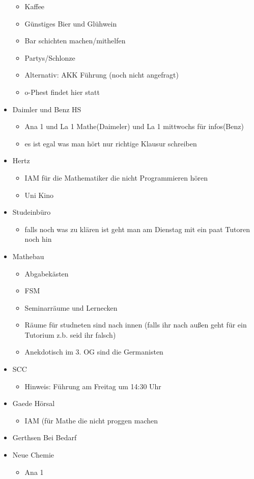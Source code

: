 \documentclass[10pt,twocolumn,ngerman]{scrartcl}
\begin{document}
\begin{itemize}
\begin{itemize}
            \item Kaffee
            \item Günstiges Bier und Glühwein
            \item Bar schichten machen/mithelfen
            \item Partys/Schlonze
            \item Alternativ: AKK Führung (noch nicht angefragt)
            \item o-Phest findet hier statt
        \end{itemize}
    \item Daimler und Benz HS
        \begin{itemize}
            \item Ana 1 und La 1 Mathe(Daimeler) und La 1 mittwochs für infos(Benz)
            \item es ist egal was man hört nur richtige Klausur schreiben
        \end{itemize}
    \item Hertz
        \begin{itemize}
            \item IAM für die Mathematiker die nicht Programmieren hören
            \item Uni Kino
        \end{itemize}
    \item Studeinbüro
        \begin{itemize}
            \item falls noch was zu klären ist geht man am Dienstag mit ein paat Tutoren
                noch hin
        \end{itemize}
    \item Mathebau
        \begin{itemize}
            \item Abgabekästen
            \item FSM
            \item Seminarräume und Lernecken
            \item Räume für studneten sind nach innen (falls ihr nach außen geht für
                ein Tutorium z.b. seid ihr falsch)
            \item Anekdotisch im 3. OG sind die Germanisten
        \end{itemize}
    \item SCC
        \begin{itemize}
            \item Hinweis: Führung am Freitag um 14:30 Uhr
        \end{itemize}
    \item Gaede Hörsal
        \begin{itemize}
            \item IAM (für Mathe die nicht proggen machen
        \end{itemize}
    \item Gerthsen Bei Bedarf
    \item Neue Chemie
        \begin{itemize}
            \item Ana 1
        \end{itemize}
\end{itemize}
\end{document}
